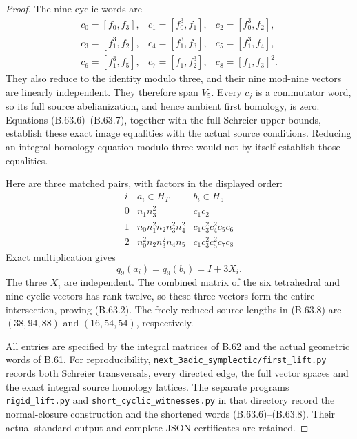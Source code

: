 \begin{proof}
The nine cyclic words are
\[
\begin{array}{lll}
 c_0=[f_0,f_3],& c_1=[f_0^3,f_1],&c_2=[f_0^3,f_2],\\
 c_3=[f_1^3,f_2],&c_4=[f_1^3,f_3],&c_5=[f_1^3,f_4],\\
 c_6=[f_1^3,f_5],&c_7=[f_1,f_2^3],&c_8=[f_1,f_3]^2.
\end{array}                                                 \tag{B.63.7}
\]
They also reduce to the identity modulo three, and
their nine mod-nine vectors are linearly independent.
They therefore span $V_5$.
Every $c_j$ is a commutator word, so its full source
abelianization, and hence ambient first homology, is zero.
Equations (B.63.6)--(B.63.7), together with the full
Schreier upper bounds, establish these exact image
equalities with the actual source conditions.
Reducing an integral homology equation modulo three
would not by itself establish those equalities.

Here are three matched pairs, with factors in the
displayed order:
\[
\begin{array}{c|l|l}
 i&a_i\in H_T&b_i\in H_5\\\hline
 0&n_1n_3^2&c_1c_2\\
 1&n_0n_1^2n_2n_3^2n_4^2&c_1c_3^2c_4^2c_5c_6\\
 2&n_0^2n_2n_3^2n_4n_5&c_1c_3^2c_5^2c_7c_8
\end{array}                                                 \tag{B.63.8}
\]
Exact multiplication gives
\[
                 q_9(a_i)=q_9(b_i)=I+3X_i.
                                                               \tag{B.63.9}
\]
The three $X_i$ are independent.
The combined matrix of the six tetrahedral and nine
cyclic vectors has rank twelve, so these three vectors
form the entire intersection, proving (B.63.2).
The freely reduced source lengths in (B.63.8) are
$(38,94,88)$ and $(16,54,54)$, respectively.

All entries are specified by the integral matrices of
B.62 and the actual geometric words of B.61.
For reproducibility,
\nolinkurl{next_3adic_symplectic/first_lift.py}
records both Schreier transversals, every directed edge,
the full vector spaces and the exact integral source
homology lattices.
The separate programs
\nolinkurl{rigid_lift.py} and
\nolinkurl{short_cyclic_witnesses.py} in that directory
record the normal-closure construction and the shortened
words (B.63.6)--(B.63.8).
Their actual standard output and complete JSON
certificates are retained.


\end{proof}
